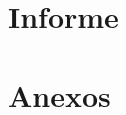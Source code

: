 \begin{Form}
\graphicspath{{../../../assets/imgs}}
\figuraDatosCSV
\cubierta
\portada
\resumen
\tableofcontents
{\chapter{Informe}
\Introduccion
{%
\NucleoDelInformeConIlustracionesYTablas
\Objeto
\normas
\teoria
\Metodologia
\resultados
}
\ConclusionesYRecomendaciones
\Referencias
}


\appendix
{\chapter{Anexos} %
\IlustracionesOTablasSuplementarias
\MaterialExcepcional
\Bibliografia
\DescripcionDeEquiposTecnicasOProgramasDeOrdenador
\hojadedatosdeldocumento
}

















\end{Form}



